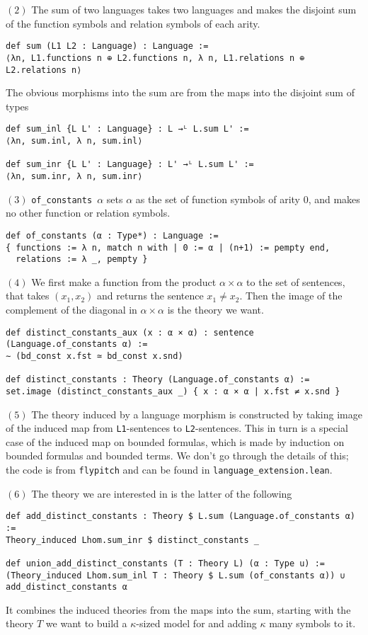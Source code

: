 \documentclass{article}
\newcommand{\al}{\alpha}
\newcommand{\<}{\langle}
\renewcommand{\>}{\rangle}
\theoremstyle{definitionstyle}
\theoremstyle{exercisestyle}
\theoremstyle{remarkstyle}
\begin{document}
$(2)$ The sum of two languages takes two languages and makes the
disjoint sum of the function symbols and relation symbols of
each arity.
\begin{lstlisting}
def sum (L1 L2 : Language) : Language :=
⟨λn, L1.functions n ⊕ L2.functions n, λ n, L1.relations n ⊕ L2.relations n⟩ \end{lstlisting}
The obvious morphisms into the sum are from the maps into the disjoint
sum of types
\begin{lstlisting}
def sum_inl {L L' : Language} : L →ᴸ L.sum L' :=
⟨λn, sum.inl, λ n, sum.inl⟩

def sum_inr {L L' : Language} : L' →ᴸ L.sum L' :=
⟨λn, sum.inr, λ n, sum.inr⟩ \end{lstlisting}

$(3)$ \texttt{of\_constants $\al$} sets $\al$ as the set of function symbols
of arity $0$, and makes no other function or relation symbols.
\begin{lstlisting}
def of_constants (α : Type*) : Language :=
{ functions := λ n, match n with | 0 := α | (n+1) := pempty end,
  relations := λ _, pempty } \end{lstlisting}

$(4)$ We first make a function from the product $\al \times \al$ to
the set of sentences, that takes $(x_1,x_2)$ and returns the sentence
$x_{1} \ne x_{2}$.
Then the image of the complement of the diagonal in $\al \times \al$
is the theory we want.

\begin{lstlisting}
def distinct_constants_aux (x : α × α) : sentence (Language.of_constants α) :=
∼ (bd_const x.fst ≃ bd_const x.snd)

def distinct_constants : Theory (Language.of_constants α) :=
set.image (distinct_constants_aux _) { x : α × α | x.fst ≠ x.snd } \end{lstlisting}

$(5)$ The theory induced by a language morphism is constructed by
taking image of the induced map from \texttt{L1}-sentences
to \texttt{L2}-sentences.
This in turn is a special case of the induced map on bounded formulas,
which is made by induction on bounded formulas and bounded terms.
We don't go through the details of this;
the code is from \texttt{flypitch} and can be found in
\texttt{language\_extension.lean}.

$(6)$ The theory we are interested in is the latter of the following
\begin{lstlisting}
def add_distinct_constants : Theory $ L.sum (Language.of_constants α) :=
Theory_induced Lhom.sum_inr $ distinct_constants _

def union_add_distinct_constants (T : Theory L) (α : Type u) :=
(Theory_induced Lhom.sum_inl T : Theory $ L.sum (of_constants α)) ∪ add_distinct_constants α \end{lstlisting}
It combines the induced theories from the maps into the sum,
starting with the theory $T$ we want to build a $\kappa$-sized
model for and adding $\kappa$ many symbols to it.
\end{document}
